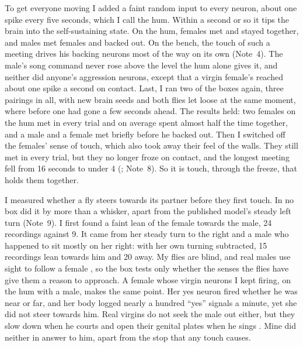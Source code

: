 \documentclass[11pt,a4paper]{article}
\newcommand{\note}[1]{(Note~#1)}
\begin{document}
To get everyone moving I added a faint random input to every neuron, about one spike every five seconds, which I call the hum. Within a second or so it tips the brain into the self-sustaining state. On the hum, females met and stayed together, and males met females and backed out. On the bench, the touch of such a meeting drives his backing neurons most of the way on its own \note{4}. The male's song command never rose above the level the hum alone gives it, and neither did anyone's aggression neurons, except that a virgin female's reached about one spike a second on contact. Last, I ran two of the boxes again, three pairings in all, with new brain seeds and both flies let loose at the same moment, where before one had gone a few seconds ahead. The results held: two females on the hum met in every trial and on average spent almost half the time together, and a male and a female met briefly before he backed out. Then I switched off the females' sense of touch, which also took away their feel of the walls. They still met in every trial, but they no longer froze on contact, and the longest meeting fell from 16 seconds to under 4 (; Note~8). So it is touch, through the freeze, that holds them together.

I measured whether a fly steers towards its partner before they first touch. In no box did it by more than a whisker, apart from the published model's steady left turn \note{9}. I first found a faint lean of the female towards the male, 24 recordings against 9. It came from her steady turn to the right and a male who happened to sit mostly on her right: with her own turning subtracted, 15 recordings lean towards him and 20 away. My flies are blind, and real males use sight to follow a female \citep{ribeiro2018visual}, so the box tests only whether the senses the flies have give them a reason to approach. A female whose virgin neurons I kept firing, on the hum with a male, makes the same point. Her yes neuron fired whether he was near or far, and her body logged nearly a hundred ``yes'' signals a minute, yet she did not steer towards him. Real virgins do not seek the male out either, but they slow down when he courts and open their genital plates when he sings \citep{bussell2014abdominal,wang2021neural}. Mine did neither in answer to him, apart from the stop that any touch causes.
\end{document}
